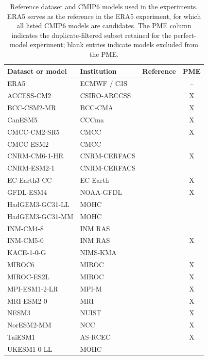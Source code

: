 \begin{table}[t]
\centering
\footnotesize
\caption{Reference dataset and CMIP6 models used in the experiments. ERA5 serves as the reference in the ERA5 experiment, for which all listed CMIP6 models are candidates. The PME column indicates the duplicate-filtered subset retained for the perfect-model experiment; blank entries indicate models excluded from the PME.}
\label{tab:cmip6_models}
\begin{tabular}{p{3.2cm}p{2.2cm}p{4.8cm}c}
\hline
Dataset or model & Institution & Reference & PME \\
\hline
ERA5 & ECMWF / C3S & \citet{HersbachEtAlERA5Reanalysis2020} & -- \\
ACCESS-CM2 & CSIRO-ARCCSS & \citet{DixEtAlACCESSCM2CMIP2019} & X \\
BCC-CSM2-MR & BCC-CMA & \citet{XinEtAlBCCCSM2MRCMIP2018} & X \\
CanESM5 & CCCma & \citet{SwartEtAlCanESM5CMIP2019} & X \\
CMCC-CM2-SR5 & CMCC & \citet{LovatoPeanoCMCCCM2SR5CMIP2020} & X \\
CMCC-ESM2 & CMCC & \citet{LovatoEtAlCMCCESM2CMIP2021} &  \\
CNRM-CM6-1-HR & CNRM-CERFACS & \citet{VoldoireCNRMCM61HRCMIP2019} & X \\
CNRM-ESM2-1 & CNRM-CERFACS & \citet{SeferianCNRMESM21CMIP2018} &  \\
EC-Earth3-CC & EC-Earth & \citet{ECEarthConsortiumECEarth3CCCMIP2020} & X \\
GFDL-ESM4 & NOAA-GFDL & \citet{KrastingEtAlGFDLESM4CMIP2018} & X \\
HadGEM3-GC31-LL & MOHC & \citet{RidleyEtAlHadGEM3GC31LLCMIP2018} &  \\
HadGEM3-GC31-MM & MOHC & \citet{RidleyEtAlHadGEM3GC31MMCMIP2019} &  \\
INM-CM4-8 & INM RAS & \citet{VolodinEtAlINMCM48CMIP2019} &  \\
INM-CM5-0 & INM RAS & \citet{VolodinEtAlINMCM50CMIP2019} & X \\
KACE-1-0-G & NIMS-KMA & \citet{ByunEtAlKACE10GCMIP2019} &  \\
MIROC6 & MIROC & \citet{TatebeWatanabeMIROC6CMIP2018} & X \\
MIROC-ES2L & MIROC & \citet{HajimaEtAlMIROCES2LCMIP2019} & X \\
MPI-ESM1-2-LR & MPI-M & \citet{WienersEtAlMPIESM12LRCMIP2019} & X \\
MRI-ESM2-0 & MRI & \citet{YukimotoEtAlMRIESM20CMIP2019} & X \\
NESM3 & NUIST & \citet{CaoWangNESM3CMIP2019} & X \\
NorESM2-MM & NCC & \citet{BentsenEtAlNorESM2MMCMIP2019} & X \\
TaiESM1 & AS-RCEC & \citet{LeeLiangTaiESM1CMIP2019} & X \\
UKESM1-0-LL & MOHC & \citet{TangEtAlUKESM10LLCMIP2019} &  \\
\hline
\end{tabular}
\end{table}
